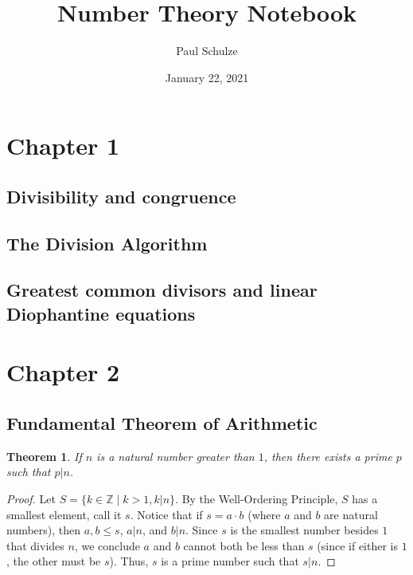 \documentclass{article}
\title{Number Theory Notebook}
\author{Paul Schulze}
\date{January 22, 2021}
\newtheorem{thm}{Theorem}[section]
\numberwithin{equation}{thm}
\begin{document}
\maketitle



\section{Chapter 1}

\subsection*{Divisibility and congruence}




\subsection*{The Division Algorithm}




\subsection*{Greatest common divisors and linear Diophantine equations}





\pagebreak



\section{Chapter 2}

\subsection*{Fundamental Theorem of Arithmetic}

\begin{thm} \label{2.1}
  If $n$ is a natural number greater than $1$, then there exists a prime $p$ such that $p | n$.
\end{thm}

\begin{proof}
  Let $S = \{k \in \mathbb{Z} \mid k > 1, k | n\}$. By the Well-Ordering Principle, $S$ has a smallest element, call it $s$. Notice that if $s = a \cdot b$ (where $a$ and $b$ are natural numbers), then $a, b \leq s$, $a | n$, and $b | n$. Since $s$ is the smallest number besides $1$ that divides $n$, we conclude $a$ and $b$ cannot both be less than $s$ (since if either is $1$, the other must be $s$). Thus, $s$ is a prime number such that $s | n$.
\end{proof}
\end{document}
